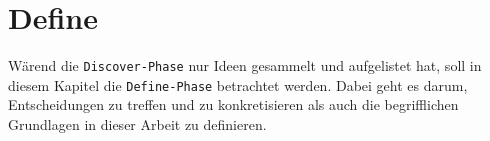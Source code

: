 \section{Define}
\label{sec:define}
  Wärend die \texttt{Discover-Phase} nur Ideen gesammelt und aufgelistet hat, soll in diesem Kapitel die \texttt{Define-Phase} betrachtet werden. Dabei geht es darum, Entscheidungen zu treffen und zu konkretisieren als auch die begrifflichen Grundlagen in dieser Arbeit zu definieren.
  
  
  
  
  
  
  
